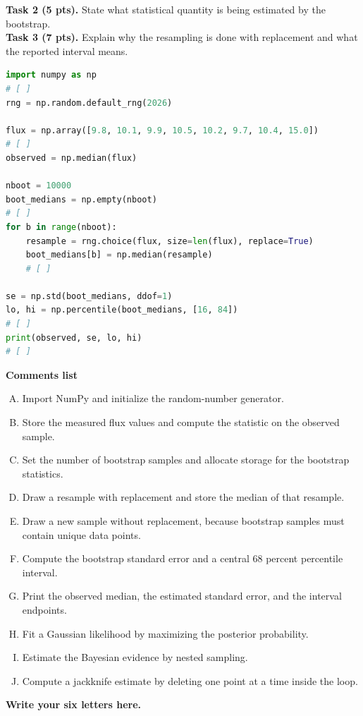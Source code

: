 \documentclass{article}
\begin{document}
\textbf{Task 2 (5 pts).} State what statistical quantity is being estimated by the bootstrap. \\

\textbf{Task 3 (7 pts).} Explain why the resampling is done with replacement and what the reported interval means. \\

\begin{lstlisting}[language=Python,basicstyle=\ttfamily\normalsize]
import numpy as np
# [ ]
rng = np.random.default_rng(2026)

flux = np.array([9.8, 10.1, 9.9, 10.5, 10.2, 9.7, 10.4, 15.0])
# [ ]
observed = np.median(flux)

nboot = 10000
boot_medians = np.empty(nboot)
# [ ]
for b in range(nboot):
    resample = rng.choice(flux, size=len(flux), replace=True)
    boot_medians[b] = np.median(resample)
    # [ ]

se = np.std(boot_medians, ddof=1)
lo, hi = np.percentile(boot_medians, [16, 84])
# [ ]
print(observed, se, lo, hi)
# [ ]
\end{lstlisting}

\textbf{Comments list}
\begin{enumerate}[A.]
\item Import NumPy and initialize the random-number generator.
\item Store the measured flux values and compute the statistic on the observed sample.
\item Set the number of bootstrap samples and allocate storage for the bootstrap statistics.
\item Draw a resample with replacement and store the median of that resample.
\item Draw a new sample without replacement, because bootstrap samples must contain unique data points.
\item Compute the bootstrap standard error and a central 68 percent percentile interval.
\item Print the observed median, the estimated standard error, and the interval endpoints.
\item Fit a Gaussian likelihood by maximizing the posterior probability.
\item Estimate the Bayesian evidence by nested sampling.
\item Compute a jackknife estimate by deleting one point at a time inside the loop.
\end{enumerate}

\textbf{Write your six letters here.}
\end{document}
